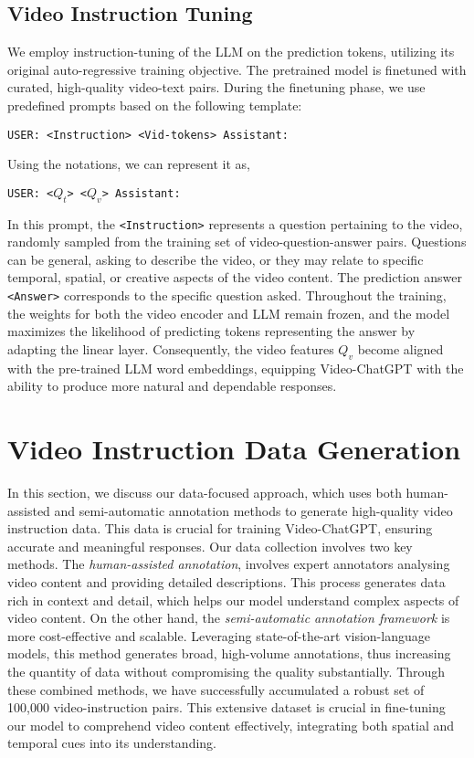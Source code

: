 \subsection{Video Instruction Tuning}
We employ instruction-tuning of the LLM on the prediction tokens, utilizing its original auto-regressive training objective. The pretrained model is finetuned with curated, high-quality video-text pairs. During the finetuning phase, we use predefined prompts based on the following template:
\begin{center}
\noindent\texttt{USER: <Instruction> <Vid-tokens> Assistant:}
\end{center}
\noindent Using the notations, we can represent it as,
\begin{center}
\noindent\texttt{USER: <$Q_{t}$> <$Q_{v}$> Assistant:}
\end{center}

In this prompt, the \texttt{<Instruction>} represents a question pertaining to the video, randomly sampled from the training set of video-question-answer pairs. Questions can be general, asking to describe the video, or they may relate to specific temporal, spatial, or creative aspects of the video content. The prediction answer \texttt{<Answer>} corresponds to the specific question asked. Throughout the training, the weights for both the video encoder and LLM remain frozen, and the model maximizes the likelihood of predicting tokens representing the answer by adapting the linear layer. Consequently, the video features $Q_{v}$ become aligned with the pre-trained LLM word embeddings, equipping Video-ChatGPT with the ability to produce more natural and dependable responses.

\section{Video Instruction Data Generation}
\label{video_instruction_data}
In this section, we discuss our data-focused approach, which uses both human-assisted and semi-automatic annotation methods to generate high-quality video instruction data. This data is crucial for training Video-ChatGPT, ensuring accurate and meaningful responses. Our data collection involves two key methods. The \textit{human-assisted annotation}, involves expert annotators analysing video content and providing detailed descriptions. This process generates data rich in context and detail, which helps our model understand complex aspects of video content.
On the other hand, the \textit{semi-automatic annotation framework} is more cost-effective and scalable. Leveraging state-of-the-art vision-language models, this method generates broad, high-volume annotations, thus increasing the quantity of data without compromising the quality substantially.
Through these combined methods, we have successfully accumulated a robust set of 100,000 video-instruction pairs. This extensive dataset is crucial in fine-tuning our model to comprehend video content effectively, integrating both spatial and temporal cues into its understanding.

